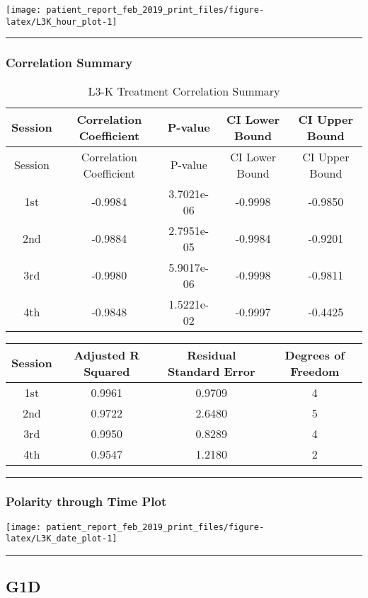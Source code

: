 \documentclass[]{article}
\begin{document}
\texttt{[image: patient\_report\_feb\_2019\_print\_files/figure-latex/L3K\_hour\_plot-1]}

\begin{center}\rule{0.5\linewidth}{\linethickness}\end{center}

\subsubsection{Correlation Summary}\label{correlation-summary-4}

\begin{longtable}[]{@{}ccccc@{}}
\caption{L3-K Treatment Correlation Summary}\tabularnewline
\toprule
Session & Correlation Coefficient & P-value & CI Lower Bound & CI Upper
Bound\tabularnewline
\midrule
\endfirsthead
\toprule
Session & Correlation Coefficient & P-value & CI Lower Bound & CI Upper
Bound\tabularnewline
\midrule
\endhead
1st & -0.9984 & 3.7021e-06 & -0.9998 & -0.9850\tabularnewline
2nd & -0.9884 & 2.7951e-05 & -0.9984 & -0.9201\tabularnewline
3rd & -0.9980 & 5.9017e-06 & -0.9998 & -0.9811\tabularnewline
4th & -0.9848 & 1.5221e-02 & -0.9997 & -0.4425\tabularnewline
\bottomrule
\end{longtable}

\begin{longtable}[]{@{}cccc@{}}
\toprule
Session & Adjusted R Squared & Residual Standard Error & Degrees of
Freedom\tabularnewline
\midrule
\endhead
1st & 0.9961 & 0.9709 & 4\tabularnewline
2nd & 0.9722 & 2.6480 & 5\tabularnewline
3rd & 0.9950 & 0.8289 & 4\tabularnewline
4th & 0.9547 & 1.2180 & 2\tabularnewline
\bottomrule
\end{longtable}

\begin{center}\rule{0.5\linewidth}{\linethickness}\end{center}

\subsubsection{Polarity through Time
Plot}\label{polarity-through-time-plot-4}

\texttt{[image: patient\_report\_feb\_2019\_print\_files/figure-latex/L3K\_date\_plot-1]}

\begin{center}\rule{0.5\linewidth}{\linethickness}\end{center}

\subsection{G1D}\label{g1d}
\end{document}
